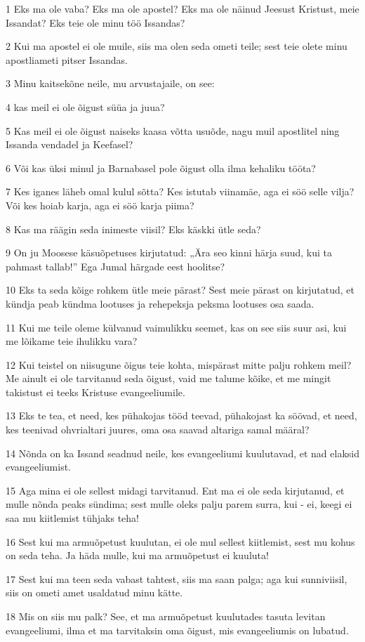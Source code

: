\par 1 Eks ma ole vaba? Eks ma ole apostel? Eks ma ole näinud Jeesust Kristust, meie Issandat? Eks teie ole minu töö Issandas?
\par 2 Kui ma apostel ei ole muile, siis ma olen seda ometi teile; sest teie olete minu apostliameti pitser Issandas.
\par 3 Minu kaitsekõne neile, mu arvustajaile, on see:
\par 4 kas meil ei ole õigust süüa ja juua?
\par 5 Kas meil ei ole õigust naiseks kaasa võtta usuõde, nagu muil apostlitel ning Issanda vendadel ja Keefasel?
\par 6 Või kas üksi minul ja Barnabasel pole õigust olla ilma kehaliku tööta?
\par 7 Kes iganes läheb omal kulul sõtta? Kes istutab viinamäe, aga ei söö selle vilja? Või kes hoiab karja, aga ei söö karja piima?
\par 8 Kas ma räägin seda inimeste viisil? Eks käskki ütle seda?
\par 9 On ju Moosese käsuõpetuses kirjutatud: „Ära seo kinni härja suud, kui ta pahmast tallab!” Ega Jumal härgade eest hoolitse?
\par 10 Eks ta seda kõige rohkem ütle meie pärast? Sest meie pärast on kirjutatud, et kündja peab kündma lootuses ja rehepeksja peksma lootuses osa saada.
\par 11 Kui me teile oleme külvanud vaimulikku seemet, kas on see siis suur asi, kui me lõikame teie ihulikku vara?
\par 12 Kui teistel on niisugune õigus teie kohta, mispärast mitte palju rohkem meil? Me ainult ei ole tarvitanud seda õigust, vaid me talume kõike, et me mingit takistust ei teeks Kristuse evangeeliumile.
\par 13 Eks te tea, et need, kes pühakojas tööd teevad, pühakojast ka söövad, et need, kes teenivad ohvrialtari juures, oma osa saavad altariga samal määral?
\par 14 Nõnda on ka Issand seadnud neile, kes evangeeliumi kuulutavad, et nad elaksid evangeeliumist.
\par 15 Aga mina ei ole sellest midagi tarvitanud. Ent ma ei ole seda kirjutanud, et mulle nõnda peaks sündima; sest mulle oleks palju parem surra, kui - ei, keegi ei saa mu kiitlemist tühjaks teha!
\par 16 Sest kui ma armuõpetust kuulutan, ei ole mul sellest kiitlemist, sest mu kohus on seda teha. Ja häda mulle, kui ma armuõpetust ei kuuluta!
\par 17 Sest kui ma teen seda vabast tahtest, siis ma saan palga; aga kui sunniviisil, siis on ometi amet usaldatud minu kätte.
\par 18 Mis on siis mu palk? See, et ma armuõpetust kuulutades tasuta levitan evangeeliumi, ilma et ma tarvitaksin oma õigust, mis evangeeliumis on lubatud.

